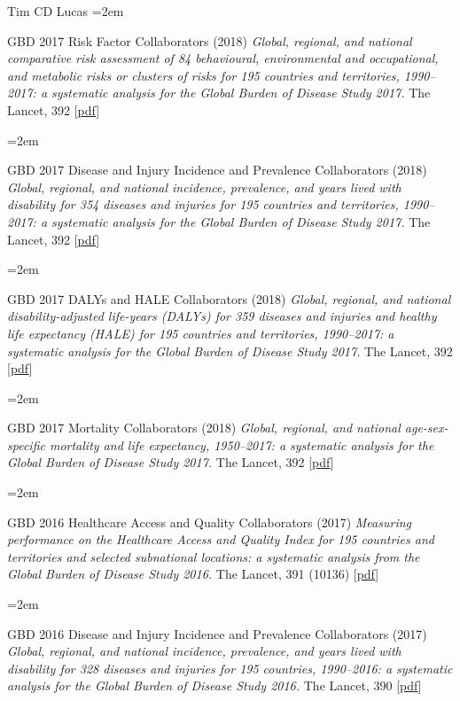 \documentclass{scrartcl}
\newcommand{\MarginText}[1]{\marginpar{\raggedleft\itshape\small#1}} %
\newcommand{\Description}[1]{\hangindent=2em\hangafter=0\noindent\raggedright\footnotesize{#1}\par\normalsize\vspace{1em}} %
\begin{document}
\begin{cv}{Tim {\Large CD} Lucas}
\Description{\MarginText{2018}GBD 2017 Risk Factor Collaborators (2018) \emph{Global, regional, and national comparative risk assessment of 84 behavioural, environmental and occupational, and metabolic risks or clusters of risks for 195 countries and territories, 1990--2017: a systematic analysis for the Global Burden of Disease Study 2017.} The Lancet, 392 [\href{https://reader.elsevier.com/reader/sd/pii/S0140673618322256?token=B51BB41EDB592105E398079BFEE0CA91BB2DA80DC879A7B3CFD538DFBF8ADE6FA424858694B94E7860E6AE8461E553E7}{pdf}]}

\Description{GBD 2017 Disease and Injury Incidence and Prevalence Collaborators (2018) \emph{Global, regional, and national incidence, prevalence, and years lived with disability for 354 diseases and injuries for 195 countries and territories, 1990--2017: a systematic analysis for the Global Burden of Disease Study 2017.} The Lancet, 392 [\href{https://www.sciencedirect.com/science/article/pii/S0140673618322797/pdfft?md5=7f77aa9068dc470c4dec82747c586883&pid=1-s2.0-S0140673618322797-main.pdf}{pdf}]}


\Description{GBD 2017 DALYs and HALE Collaborators (2018) \emph{Global, regional, and national disability-adjusted life-years (DALYs) for 359 diseases and injuries and healthy life expectancy (HALE) for 195 countries and territories, 1990--2017: a systematic analysis for the Global Burden of Disease Study 2017.} The Lancet, 392 [\href{https://www.sciencedirect.com/science/article/pii/S0140673618318919/pdfft?md5=e63230d66805f99e38a7dc60873c7bf0&pid=1-s2.0-S0140673618318919-main.pdf}{pdf}]}

\Description{GBD 2017 Mortality Collaborators (2018) \emph{Global, regional, and national age-sex-specific mortality and life expectancy, 1950--2017: a systematic analysis for the Global Burden of Disease Study 2017.} The Lancet, 392 [\href{https://www.sciencedirect.com/science/article/pii/S0140673618323353/pdfft?md5=06fd82a2bba62e2be2849270cc28fe17&pid=1-s2.0-S0140673618323353-main.pdf}{pdf}]}

\Description{GBD 2016 Healthcare Access and Quality Collaborators (2017) \emph{Measuring performance on the Healthcare Access and Quality Index for 195 countries and territories and selected subnational locations: a systematic analysis from the Global Burden of Disease Study 2016.} The Lancet, 391 (10136) [\href{https://www.thelancet.com/action/showPdf?pii=S0140-6736\%2817\%2932336-X}{pdf}]}



\Description{\MarginText{2017}GBD 2016 Disease and Injury Incidence and Prevalence Collaborators (2017) \emph{Global, regional, and national incidence, prevalence, and years lived with disability for 328 diseases and injuries for 195 countries, 1990--2016: a systematic analysis for the Global Burden of Disease Study 2016.} The Lancet, 390 [\href{https://www.thelancet.com/action/showPdf?pii=S0140-6736\%2817\%2932154-2}{pdf}]}


\end{cv}
\end{document}
